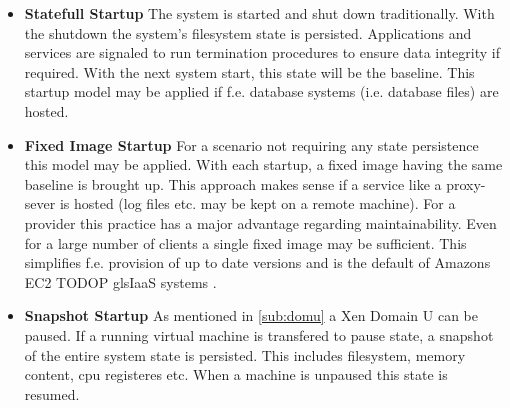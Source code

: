 \begin{itemize}
	\item \textbf{Statefull Startup} The system is started and shut down traditionally. With the shutdown the system's filesystem state is persisted. Applications and services are signaled to run termination procedures to ensure data integrity if required. With the next system start, this state will be the baseline. This startup model may be applied if f.e. database systems (i.e. database files) are hosted.
	\item \textbf{Fixed Image Startup} For a scenario not requiring any state persistence this model may be applied. With each startup, a fixed image having the same baseline is brought up. This approach makes sense if a service like a proxy-sever is hosted (log files etc. may be kept on a remote machine). For a provider this practice has a major advantage regarding maintainability. Even for a large number of clients a single fixed image may be sufficient. This simplifies f.e. provision of up to date versions and is the default of Amazons EC2 TODOP gls{IaaS} systems \cite{everspaugh2014not}.
	\item \textbf{Snapshot Startup} As mentioned in \ref{sub:domu} a Xen Domain U can be paused. If a running virtual machine is transfered to pause state, a snapshot of the entire system state is persisted. This includes filesystem, memory content, cpu registeres etc. When a machine is unpaused this state is resumed.	
\end{itemize}
%
%
